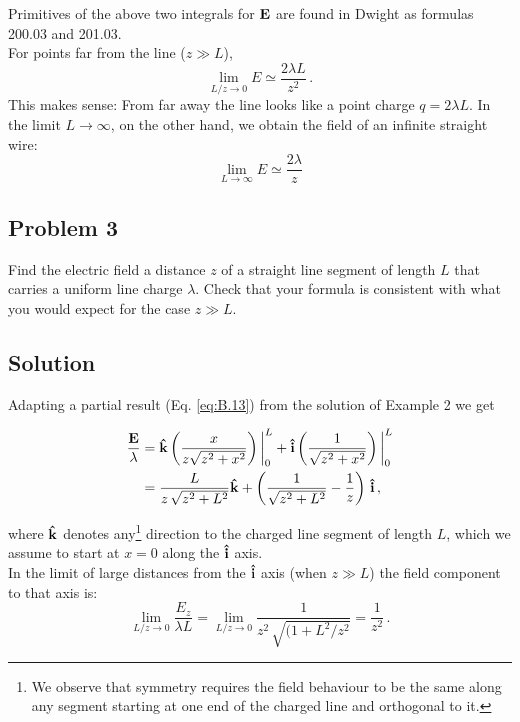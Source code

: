 Primitives of the above two integrals for $\vb{E}$ are found in Dwight as formulas 200.03 and 201.03.\\

For points far from the line ($z \gg L$),
$$ \lim_{L/z \rightarrow 0}  E \simeq \frac{2\lambda L}{z^2}\,. $$
This makes sense: From far away the line looks like a point charge $q = 2\lambda L$. 
In the limit $L \rightarrow \infty$, on the other hand, we obtain the field of an infinite straight wire: 
\begin{equation}\label{eq:B.15}
\lim_{L \rightarrow \infty} E \simeq \frac{2\lambda}{z}
\end{equation}




\subsection*{Problem 3}
Find the electric field a distance $z$  of a straight line segment of length $L$ that carries a uniform line charge $\lambda$. Check that your formula is consistent with what you would expect for the case $z \gg L$. 

\subsection*{Solution}

Adapting a partial result (Eq. \ref{eq:B.13}) from the solution of Example 2 we get

\begin{align}
\frac{\vb{E}}{\lambda} &= \vu{k}  \left( \frac{x}{z \sqrt{z^2 + x^2}}\right)\bigg\rvert_{0}^{L} + \vu{i} \left(\frac{1}{\sqrt{z^2 + x^2}}\right)\bigg\rvert_{0}^{L}\label{eq:B.16} \\
       &= \frac{L}{z\,\sqrt{z^2 + L^2}} \vu{k} + \left( \frac{1}{\sqrt{z^2 + L^2}} - \frac{1}{z} \right)\,\vu{i}\,,\label{eq:B.17}
\end{align}

where $\vu{k}$ denotes any\footnote{We observe that symmetry requires the field behaviour to be the same along any segment starting at one end of the charged line and orthogonal to it.} direction  to the charged line segment of length $L$, which we assume to start at $x=0$ along the $\vu{i}$ axis.\\

In the limit of large distances from the $\vu{i}$ axis (when $z \gg L$) the field component  to that axis is:
$$ \lim_{L/z \rightarrow 0}\frac{E_z}{\lambda L} = \lim_{L/z \rightarrow 0} \frac{1}{z^2\,\sqrt{(1 + L^2/z^2}} = \frac{1}{z^2}\,.$$

